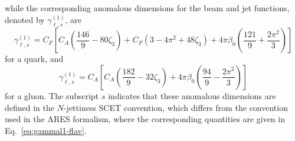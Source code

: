 while the corresponding anomalous dimensions for the beam and jet
functions, denoted by $\gamma_{\ell,s}^{(1)}$, are
\begin{equation}
\label{eq:gamma-1-SCET-q}
\gamma_{\ell,s}^{(1)}
=C_F\left[
C_A\left(\frac{146}{9}-80\zeta_3\right)
+C_F(3-4\pi^2+48\zeta_3)
+4\pi\beta_0\left(\frac{121}{9}+\frac{2\pi^2}{3}\right)
\right]
\end{equation}
for a quark, and
\begin{equation}
\label{eq:gamma-1-SCET-g}
\gamma_{\ell,s}^{(1)}
=C_A\left[
C_A\left(\frac{182}{9}-32\zeta_3\right)
+4\pi\beta_0\left(\frac{94}{9}-\frac{2\pi^2}{3}\right)
\right]
\end{equation}
for a gluon. The subscript $s$ indicates that these anomalous
dimensions are defined in the $N$-jettiness SCET convention, which
differs from the convention used in the \textsc{ARES} formalism,
where the corresponding quantities are given in
Eq.~\eqref{eq:gammal1-flav}.



